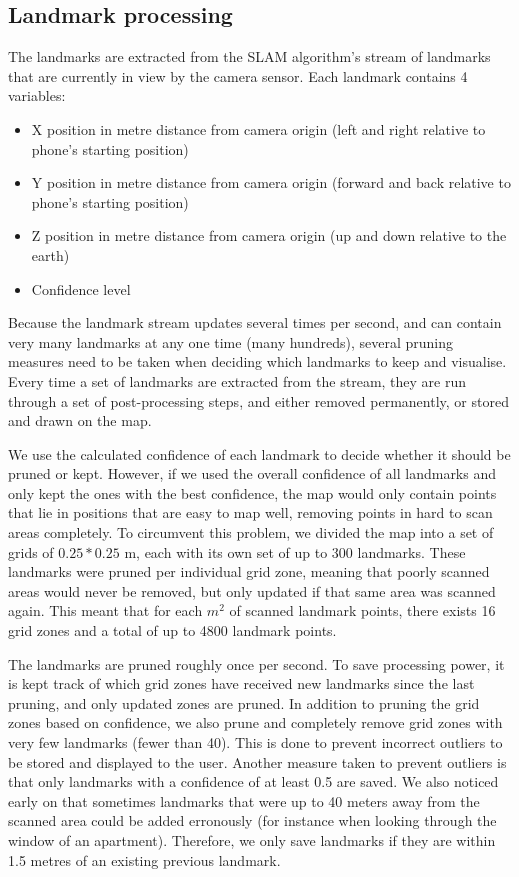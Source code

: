 \documentclass{article}
\begin{document}
\subsection{Landmark processing} \label{landmark-processing}

The landmarks are extracted from the SLAM algorithm's stream of landmarks that are currently in view by the camera sensor. Each landmark contains 4 variables:
\begin{itemize}
    \item X position in metre distance from camera origin (left and right relative to phone's starting position)
    \item Y position in metre distance from camera origin (forward and back relative to phone's starting position)
    \item Z position in metre distance from camera origin (up and down relative to the earth)
    \item Confidence level
\end{itemize}
Because the landmark stream updates several times per second, and can contain very many landmarks at any one time (many hundreds), several pruning measures need to be taken when deciding which landmarks to keep and visualise. Every time a set of landmarks are extracted from the stream, they are run through a set of post-processing steps, and either removed permanently, or stored and drawn on the map.

We use the calculated confidence of each landmark to decide whether it should be pruned or kept. However, if we used the overall confidence of all landmarks and only kept the ones with the best confidence, the map would only contain points that lie in positions that are easy to map well, removing points in hard to scan areas completely. To circumvent this problem, we divided the map into a set of grids of $0.25 * 0.25$ m, each with its own set of up to 300 landmarks. These landmarks were pruned per individual grid zone, meaning that poorly scanned areas would never be removed, but only updated if that same area was scanned again. This meant that for each $m^2$ of scanned landmark points, there exists 16 grid zones and a total of up to 4800 landmark points.

The landmarks are pruned roughly once per second. To save processing power, it is kept track of which grid zones have received new landmarks since the last pruning, and only updated zones are pruned. In addition to pruning the grid zones based on confidence, we also prune and completely remove grid zones with very few landmarks (fewer than 40). This is done to prevent incorrect outliers to be stored and displayed to the user. Another measure taken to prevent outliers is that only landmarks with a confidence of at least 0.5 are saved. We also noticed early on that sometimes landmarks that were up to 40 meters away from the scanned area could be added erronously (for instance when looking through the window of an apartment). Therefore, we only save landmarks if they are within 1.5 metres of an existing previous landmark.
\end{document}
